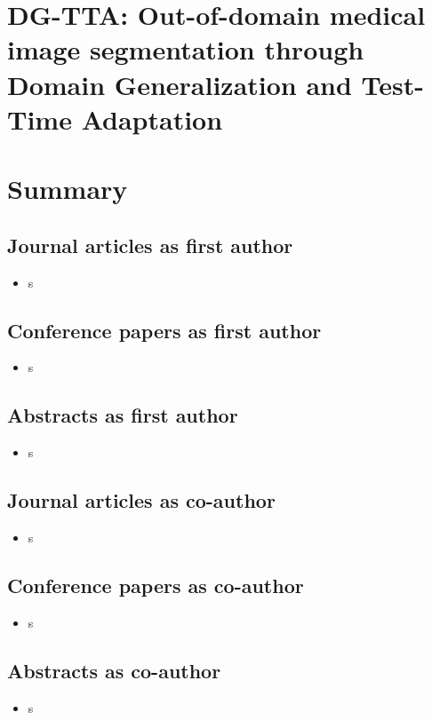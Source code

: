 \documentclass[11pt, a4paper, twoside, headsepline, titlepage, DIV=11, BCOR=12mm, captions=tableheading, chapterprefix=on, numbers=noenddot]{scrbook}
\begin{document}
    \chapter[DG-TTA]{DG-TTA: Out-of-domain medical image segmentation through Domain Generalization and Test-Time Adaptation}
        
    \chapter{Summary}
    \printbibliography[heading=bibintoc]


    \section*{Journal articles as first author}
        \begin{itemize}
            \item s
        \end{itemize}

    \section*{Conference papers as first author}
        \begin{itemize}
            \item s
        \end{itemize}

    \section*{Abstracts as first author}
        \begin{itemize}
            \item s
        \end{itemize}

    \section*{Journal articles as co-author}
        \begin{itemize}
            \item s
        \end{itemize}

    \section*{Conference papers as co-author}
        \begin{itemize}
            \item s
        \end{itemize}

    \section*{Abstracts as co-author}
        \begin{itemize}
            \item s
        \end{itemize}
\end{document}
